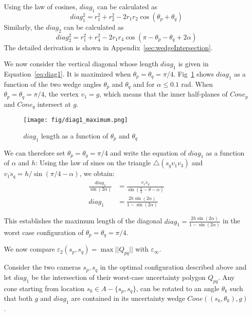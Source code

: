 Using the law of cosines, $diag_1$ can be calculated as 
\begin{equation}\label{eq:diag1}
diag_1^2 = r_1^2+r_2^2
	-2  r_1  r_2  \cos(\theta_p+\theta_q)
\end{equation}
Similarly, the $diag_2$ can be calculated as 
\begin{equation}\label{eq:diag2}
diag_2^2 = r_1^2+r_4^2
	-2 r_1  r_4  \cos(\pi - \theta_p-\theta_q + 2\alpha)
\end{equation}
The detailed derivation is shown in Appendix~\ref{sec:wedgeIntersection}. 

We now consider the vertical diagonal 
whose length $diag_1$ is given in Equation~\ref{eq:diag1}. %
It is maximized when $\theta_p = \theta_q = \pi/4$.
Fig~\ref{fig:diag1_maximum} shows $diag_1$ 
as a function of the two wedge angles $\theta_p$ and $\theta_q$ and for $\alpha \leq 0.1$ rad. 
When $\theta_p = \theta_q = \pi/4$, the vertex $v_1 = g$, which means that the inner half-planes of $Cone_p$ and $Cone_q$ intersect at $g$.

\begin{figure}[h]
\centering
	\texttt{[image: fig/diag1\_maximum.png]}
	\caption{$diag_1$ length as a function of $\theta_p$ and $\theta_q$}
	\label{fig:diag1_maximum}
\end{figure} 

We can therefore set $\theta_p = \theta_q = \pi/4$ and write the equation of $diag_1$ as a function of 
$\alpha$ and $h$: Using the law of sines on the triangle $\triangle(s_qv_1v_3)$ and $\overline{v_1s_q} = h/\sin(\pi/4-\alpha)$, we obtain:
\begin{align*}
\frac{diag_1}{\sin(2\alpha)} &= \frac{\overline{v_1s_q}}{\sin(\frac{\pi}{2}-\theta-\alpha)} \\
diag_1 &= \frac{2h\sin(2\alpha)}{1-\sin(2\alpha)}
\end{align*}

This establishes the maximum length of the diagonal $diag_1 =\frac{2h\sin(2\alpha)}{1-\sin(2\alpha)}$ in the worst case configuration of $\theta_p=\theta_q = \pi/4$. 

We now compare $\varepsilon_2(s_p, s_q) = \max||Q_{pq}||$ with $\varepsilon_\infty$.

\begin{lemma}\label{lem:diag1max}
Consider the two cameras $s_p,s_q$ in the optimal configuration described above and let  $diag_1$
be the intersection of their worst-case uncertainty polygon $Q_{pq}$.
Any cone starting from location $s_k \in A-\{s_p,s_q\}$, can be rotated to an angle $\theta_k$ such that both $g$ and 
$diag_1$ are contained in its uncertainty wedge $Cone((s_k,\theta_k),g)$.
\end{lemma}

